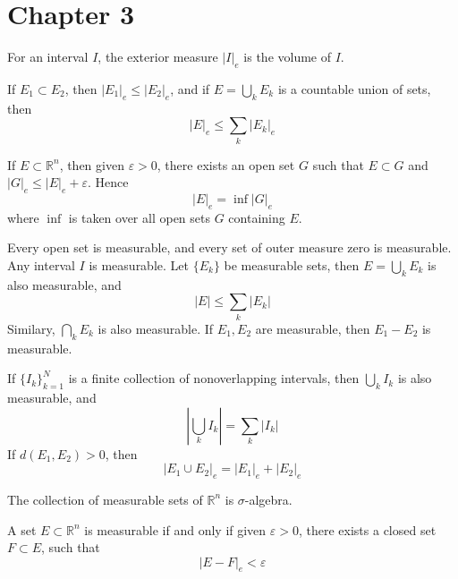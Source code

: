 \documentclass[openany]{book}
\newcommand{\R}{\mathbb{R}}
\begin{document}
\chapter*{Chapter 3}
\begin{prop}
    For an interval $I$, the exterior measure $|I|_e$ is the volume of $I$.
\end{prop}
\begin{prop}
    If $E_1\subset E_2$, then $|E_1|_e\leq|E_2|_e$, and if $E=\bigcup_kE_k$ is a countable union of sets, then 
    \begin{equation*}
        |E|_e\leq\sum_{k}|E_k|_e
    \end{equation*}
\end{prop}
\begin{thm}
    If $E\subset\R^n$, then given $\varepsilon>0$, there exists an open set $G$ such that $E\subset G$ and $|G|_e\leq |E|_e+\varepsilon$. Hence 
    \begin{equation*}
        |E|_e=\inf|G|_e
    \end{equation*}
    where $\inf$ is taken over all open sets $G$ containing $E$.
\end{thm}
\begin{prop}
    Every open set is measurable, and every set of outer measure zero is measurable. Any interval $I$ is measurable. Let $\{E_k\}$ be measurable sets, then $E=\bigcup_kE_k$ is also measurable, and 
    \begin{equation*}
        |E|\leq\sum_k|E_k|
    \end{equation*}
    Similary, $\bigcap_kE_k$ is also measurable. If $E_1,E_2$ are measurable, then $E_1-E_2$ is measurable.
\end{prop}
\begin{prop}
    If $\{I_k\}_{k=1}^N$ is a finite collection of nonoverlapping intervals, then $\bigcup_kI_k$ is also measurable, and 
    \begin{equation*}
        \left|\bigcup_kI_k\right|=\sum_k|I_k|
    \end{equation*}
    If $d(E_1,E_2)>0$, then 
    \begin{equation*}
        |E_1\cup E_2|_e=|E_1|_e+|E_2|_e
    \end{equation*}
\end{prop}
\begin{prop}
    The collection of measurable sets of $\R^n$ is $\sigma$-algebra.
\end{prop}
\begin{prop}
    A set $E\subset\R^n$ is measurable if and only if given $\varepsilon>0$, there exists a closed set $F\subset E$, such that 
    \begin{equation*}
        |E-F|_e<\varepsilon
    \end{equation*}
\end{prop}
\end{document}
